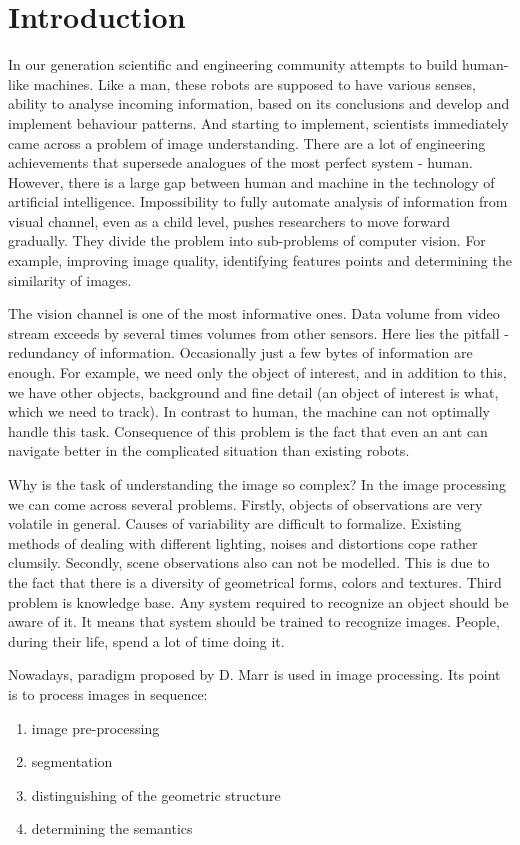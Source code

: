 \documentclass[12pt,a4paper,oneside,titlepage]{article}
\begin{document}
\section*{Introduction}
In our generation scientific and engineering community attempts to build human-like machines.
Like a man, these robots are supposed to have various senses, ability to analyse incoming information, based on its conclusions and develop and implement behaviour patterns.
And starting to implement, scientists immediately came across a problem of image understanding.
There are a lot of engineering achievements that supersede analogues of the most perfect system - human.
However, there is a large gap between human and machine in the technology of artificial intelligence.
Impossibility to fully automate analysis of information from visual channel, even as a child level, pushes researchers to move forward gradually.
They divide the problem into sub-problems of computer vision. 
For example, improving image quality, identifying features points and determining the similarity of images.

The vision channel is one of the most informative ones.
Data volume from video stream exceeds by several times volumes from other sensors.
Here lies the pitfall - redundancy of information.
Occasionally just a few bytes of information are enough.
For example, we need only the object of interest, and in addition to this, we have other objects, background and fine detail 
(an object of interest is what, which we need to track).
In contrast to human, the machine can not optimally handle this task.
Consequence of this problem is the fact that even an ant can navigate better in the complicated situation than existing robots.

Why is the task of understanding the image so complex?
In the image processing we can come across several problems.
Firstly, objects of observations are very volatile in general.
Causes of variability are difficult to formalize.
Existing methods of dealing with different lighting, noises and distortions cope rather clumsily.
Secondly, scene observations also can not be modelled.
This is due to the fact that there is a diversity of geometrical forms, colors and textures.
Third problem is knowledge base.
Any system required to recognize an object should be aware of it.
It means that system should be trained to recognize images.
People, during their life, spend a lot of time doing it.

Nowadays, paradigm proposed by D. Marr \cite{marr} is used in image processing.
Its point is to process images in sequence:
\begin{enumerate}
  \item image pre-processing
  \item segmentation
  \item distinguishing of the geometric structure
  \item determining the semantics
\end{enumerate}
\end{document}
